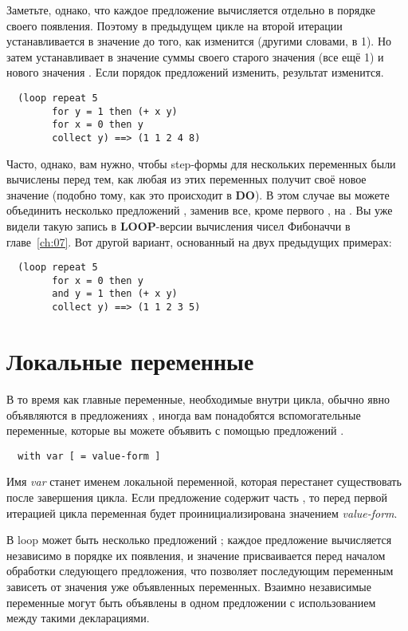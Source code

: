 Заметьте, однако, что каждое предложение  вычисляется отдельно в порядке своего
появления. Поэтому в предыдущем цикле на второй итерации  устанавливается в
значение  до того, как  изменится (другими словами, в 1). Но 
затем устанавливает в значение суммы своего старого значения (все ещё 1) и нового значения
. Если порядок предложений  изменить, результат изменится.

\begin{lstlisting}
  (loop repeat 5
        for y = 1 then (+ x y)
        for x = 0 then y
        collect y) ==> (1 1 2 4 8)
\end{lstlisting}

Часто, однако, вам нужно, чтобы step-формы для нескольких переменных были вычислены перед
тем, как любая из этих переменных получит своё новое значение (подобно тому, как это
происходит в \textbf{DO}). В этом случае вы можете объединить несколько предложений
, заменив все, кроме первого , на . Вы уже видели такую запись
в \textbf{LOOP}-версии вычисления чисел Фибоначчи в главе~\ref{ch:07}. Вот другой вариант,
основанный на двух предыдущих примерах:

\begin{lstlisting}
  (loop repeat 5 
        for x = 0 then y
        and y = 1 then (+ x y)
        collect y) ==> (1 1 2 3 5)
\end{lstlisting}

\section{Локальные переменные}

В то время как главные переменные, необходимые внутри цикла, обычно явно объявляются в
предложениях , иногда вам понадобятся вспомогательные переменные, которые вы
можете объявить с помощью предложений .

\begin{lstlisting}
  with var [ = value-form ]
\end{lstlisting}

Имя \textit{var} станет именем локальной переменной, которая перестанет существовать после
завершения цикла. Если предложение  содержит часть , то
перед первой итерацией цикла переменная будет проинициализирована значением
\textit{value-form}.

В loop может быть несколько предложений ; каждое предложение вычисляется
независимо в порядке их появления, и значение присваивается перед началом обработки
следующего предложения, что позволяет последующим переменным зависеть от значения уже
объявленных переменных. Взаимно независимые переменные могут быть объявлены в одном
предложении  с использованием  между такими дек\-ла\-ра\-ция\-ми.

